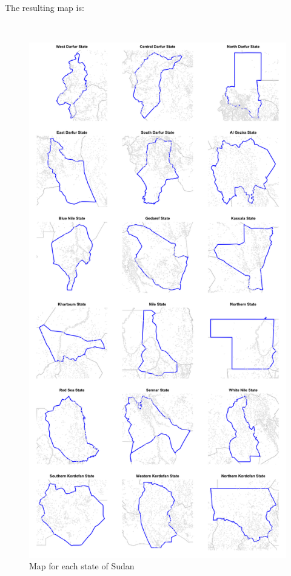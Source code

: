 \documentclass[12pt,a4paper,a4paper]{book}
\theoremstyle{definition}
\theoremstyle{definition}
\theoremstyle{definition}
\theoremstyle{remark}
\begin{document}
~

The resulting map is:

~

\begin{figure}[H]

{\centering \includegraphics{figures/map15-1} 

}

\caption{Map for each state of Sudan}\label{fig:map15}
\end{figure}


\end{document}
